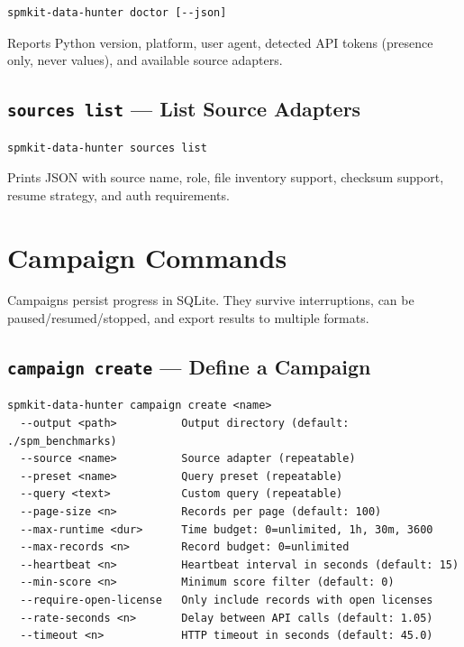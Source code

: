\documentclass[11pt,a4paper]{article}
\begin{document}
\begin{lstlisting}
spmkit-data-hunter doctor [--json]
\end{lstlisting}

Reports Python version, platform, user agent, detected API tokens (presence only, never values), and available source adapters.

\subsection{\texttt{sources list} --- List Source Adapters}

\begin{lstlisting}
spmkit-data-hunter sources list
\end{lstlisting}

Prints JSON with source name, role, file inventory support, checksum support, resume strategy, and auth requirements.

\section{Campaign Commands}

Campaigns persist progress in SQLite. They survive interruptions, can be paused/resumed/stopped, and export results to multiple formats.

\subsection{\texttt{campaign create} --- Define a Campaign}

\begin{lstlisting}
spmkit-data-hunter campaign create <name>
  --output <path>          Output directory (default: ./spm_benchmarks)
  --source <name>          Source adapter (repeatable)
  --preset <name>          Query preset (repeatable)
  --query <text>           Custom query (repeatable)
  --page-size <n>          Records per page (default: 100)
  --max-runtime <dur>      Time budget: 0=unlimited, 1h, 30m, 3600
  --max-records <n>        Record budget: 0=unlimited
  --heartbeat <n>          Heartbeat interval in seconds (default: 15)
  --min-score <n>          Minimum score filter (default: 0)
  --require-open-license   Only include records with open licenses
  --rate-seconds <n>       Delay between API calls (default: 1.05)
  --timeout <n>            HTTP timeout in seconds (default: 45.0)
\end{lstlisting}
\end{document}

